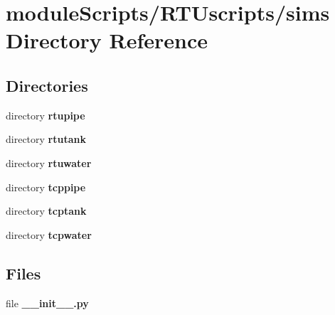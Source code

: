 \section{module\+Scripts/\+R\+T\+Uscripts/sims Directory Reference}
\label{dir_2c9d48b2d902cf346e75a7bd3a72a8bf}
\subsection*{Directories}
\begin{DoxyCompactItemize}
\item 
directory {\bf rtupipe}
\item 
directory {\bf rtutank}
\item 
directory {\bf rtuwater}
\item 
directory {\bf tcppipe}
\item 
directory {\bf tcptank}
\item 
directory {\bf tcpwater}
\end{DoxyCompactItemize}
\subsection*{Files}
\begin{DoxyCompactItemize}
\item 
file {\bf \+\_\+\+\_\+init\+\_\+\+\_\+.\+py}
\end{DoxyCompactItemize}
